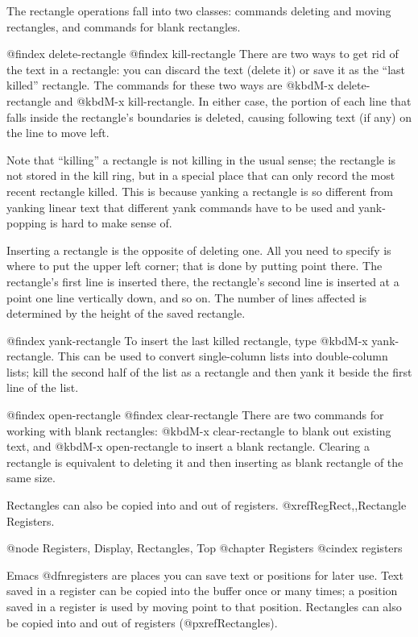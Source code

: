 {{{{{{{{  The rectangle operations fall into two classes: commands deleting and
moving rectangles, and commands for blank rectangles.

@findex delete-rectangle
@findex kill-rectangle
  There are two ways to get rid of the text in a rectangle: you can discard
the text (delete it) or save it as the ``last killed'' rectangle.  The
commands for these two ways are @kbd{M-x delete-rectangle} and @kbd{M-x
kill-rectangle}.  In either case, the portion of each line that falls inside
the rectangle's boundaries is deleted, causing following text (if any) on
the line to move left.

  Note that ``killing'' a rectangle is not killing in the usual sense; the
rectangle is not stored in the kill ring, but in a special place that
can only record the most recent rectangle killed.  This is because yanking
a rectangle is so different from yanking linear text that different yank
commands have to be used and yank-popping is hard to make sense of.

  Inserting a rectangle is the opposite of deleting one.  All you need to
specify is where to put the upper left corner; that is done by putting
point there.  The rectangle's first line is inserted there, the rectangle's
second line is inserted at a point one line vertically down, and so on.
The number of lines affected is determined by the height of the saved
rectangle.

@findex yank-rectangle
  To insert the last killed rectangle, type @kbd{M-x yank-rectangle}.
This can be used to convert single-column lists into double-column
lists; kill the second half of the list as a rectangle and then
yank it beside the first line of the list.

@findex open-rectangle
@findex clear-rectangle
  There are two commands for working with blank rectangles: @kbd{M-x
clear-rectangle} to blank out existing text, and @kbd{M-x open-rectangle}
to insert a blank rectangle.  Clearing a rectangle is equivalent to
deleting it and then inserting as blank rectangle of the same size.

  Rectangles can also be copied into and out of registers.
@xref{RegRect,,Rectangle Registers}.

@node Registers, Display, Rectangles, Top
@chapter Registers
@cindex registers

  Emacs @dfn{registers} are places you can save text or positions for
later use.  Text saved in a register can be copied into the buffer
once or many times; a position saved in a register is used by moving
point to that position.  Rectangles can also be copied into and out of
registers (@pxref{Rectangles}).

}}}}}}}}
